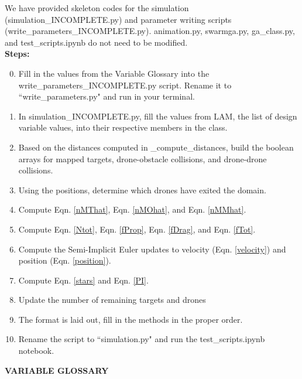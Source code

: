 \documentclass{article}
\begin{document}
We have provided skeleton codes for the simulation (simulation\_INCOMPLETE.py) and parameter writing scripts (write\_parameters\_INCOMPLETE.py). animation.py, swarmga.py, ga\_class.py, and test\_scripts.ipynb do not need to be modified. \\
\textbf{Steps:}
\begin{enumerate}
    \setcounter{enumi}{-1}
    \item Fill in the values from the Variable Glossary into the write\_parameters\_INCOMPLETE.py script. Rename it to ``write\_parameters.py" and run in your terminal. 
    \item In simulation\_INCOMPLETE.py, fill the values from LAM, the list of design variable values, into their respective members in the class.
    \item Based on the distances computed in \_compute\_distances, build the boolean arrays for mapped targets, drone-obstacle collisions, and drone-drone collisions.
    \item Using the positions, determine which drones have exited the domain.
    \item Compute Eqn. \ref{nMThat}, Eqn. \ref{nMOhat}, and Eqn. \ref{nMMhat}.
    \item Compute Eqn. \ref{Ntot}, Eqn. \ref{fProp}, Eqn. \ref{fDrag}, and Eqn. \ref{fTot}.
    \item Compute the Semi-Implicit Euler updates to velocity (Eqn. \ref{velocity}) and position (Eqn. \ref{position}).
    \item Compute Eqn. \ref{stars} and Eqn. \ref{PI}.
    \item Update the number of remaining targets and drones
    \item The format is laid out, fill in the methods in the proper order.
    \item Rename the script to ``simulation.py" and run the test\_scripts.ipynb notebook.
\end{enumerate}
 
 
\newpage

\centerline{ \bf VARIABLE GLOSSARY}
\end{document}
